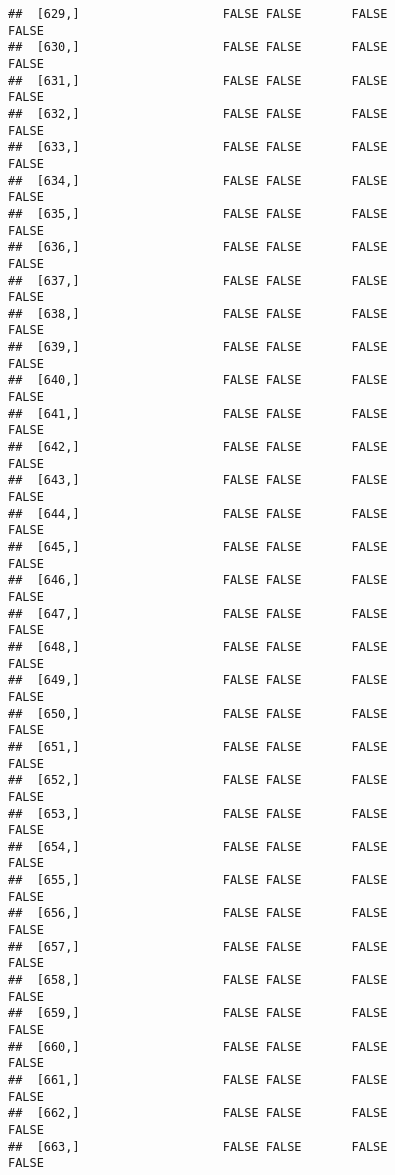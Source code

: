\documentclass[
]{article}
\begin{document}
\begin{verbatim}
##  [629,]                    FALSE FALSE       FALSE                FALSE
##  [630,]                    FALSE FALSE       FALSE                FALSE
##  [631,]                    FALSE FALSE       FALSE                FALSE
##  [632,]                    FALSE FALSE       FALSE                FALSE
##  [633,]                    FALSE FALSE       FALSE                FALSE
##  [634,]                    FALSE FALSE       FALSE                FALSE
##  [635,]                    FALSE FALSE       FALSE                FALSE
##  [636,]                    FALSE FALSE       FALSE                FALSE
##  [637,]                    FALSE FALSE       FALSE                FALSE
##  [638,]                    FALSE FALSE       FALSE                FALSE
##  [639,]                    FALSE FALSE       FALSE                FALSE
##  [640,]                    FALSE FALSE       FALSE                FALSE
##  [641,]                    FALSE FALSE       FALSE                FALSE
##  [642,]                    FALSE FALSE       FALSE                FALSE
##  [643,]                    FALSE FALSE       FALSE                FALSE
##  [644,]                    FALSE FALSE       FALSE                FALSE
##  [645,]                    FALSE FALSE       FALSE                FALSE
##  [646,]                    FALSE FALSE       FALSE                FALSE
##  [647,]                    FALSE FALSE       FALSE                FALSE
##  [648,]                    FALSE FALSE       FALSE                FALSE
##  [649,]                    FALSE FALSE       FALSE                FALSE
##  [650,]                    FALSE FALSE       FALSE                FALSE
##  [651,]                    FALSE FALSE       FALSE                FALSE
##  [652,]                    FALSE FALSE       FALSE                FALSE
##  [653,]                    FALSE FALSE       FALSE                FALSE
##  [654,]                    FALSE FALSE       FALSE                FALSE
##  [655,]                    FALSE FALSE       FALSE                FALSE
##  [656,]                    FALSE FALSE       FALSE                FALSE
##  [657,]                    FALSE FALSE       FALSE                FALSE
##  [658,]                    FALSE FALSE       FALSE                FALSE
##  [659,]                    FALSE FALSE       FALSE                FALSE
##  [660,]                    FALSE FALSE       FALSE                FALSE
##  [661,]                    FALSE FALSE       FALSE                FALSE
##  [662,]                    FALSE FALSE       FALSE                FALSE
##  [663,]                    FALSE FALSE       FALSE                FALSE

\end{verbatim}
\end{document}
